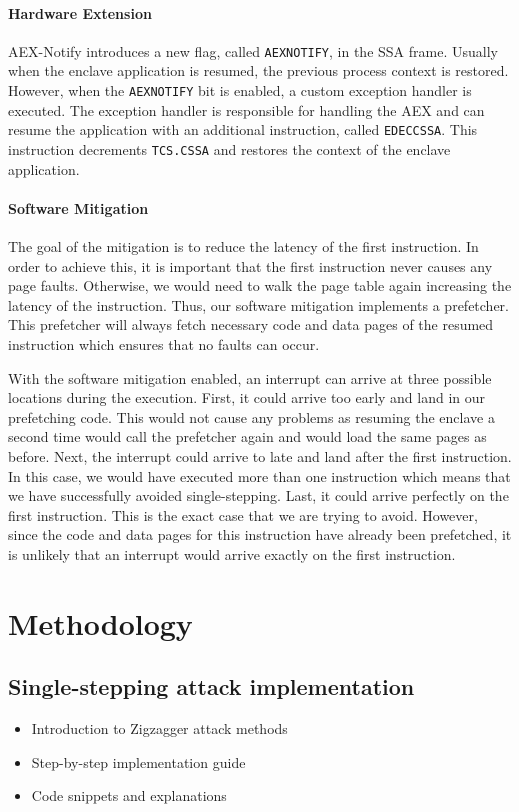 \documentclass{llncs}
\begin{document}
\paragraph{Hardware Extension}
AEX-Notify introduces a new flag, called \texttt{AEXNOTIFY}, in the SSA frame.
Usually when the enclave application is resumed, the previous process context
is restored.
However, when the \texttt{AEXNOTIFY} bit is enabled, a custom exception handler
is executed.
The exception handler is responsible for handling the AEX and can resume the
application with an additional instruction, called \texttt{EDECCSSA}.
This instruction decrements \texttt{TCS.CSSA} and restores the context of the
enclave application.

\paragraph{Software Mitigation}
The goal of the mitigation is to reduce the latency of the first instruction.
In order to achieve this, it is important that the first instruction never
causes any page faults.
Otherwise, we would need to walk the page table again increasing the latency of
the instruction.
Thus, our software mitigation implements a prefetcher.
This prefetcher will always fetch necessary code and data pages of the resumed
instruction which ensures that no faults can occur.

With the software mitigation enabled, an interrupt can arrive at three possible
locations during the execution.
First, it could arrive too early and land in our prefetching code.
This would not cause any problems as resuming the enclave a second time would
call the prefetcher again and would load the same pages as before.
Next, the interrupt could arrive to late and land after the first instruction.
In this case, we would have executed more than one instruction which means
that we have successfully avoided single-stepping.
Last, it could arrive perfectly on the first instruction.
This is the exact case that we are trying to avoid.
However, since the code and data pages for this instruction have already been prefetched,
it is unlikely that an interrupt would arrive exactly on the first instruction.

\section{Methodology}

\subsection{Single-stepping attack implementation}
\begin{itemize}
  \item Introduction to Zigzagger attack methods
  \item Step-by-step implementation guide
  \item Code snippets and explanations
\end{itemize}
\end{document}
